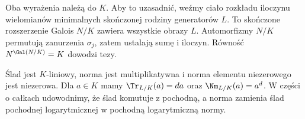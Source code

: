 Oba wyrażenia należą do $K$. Aby to uzasadnić, weźmy ciało rozkładu iloczynu wielomianów minimalnych skończonej rodziny generatorów $L$. To skończone rozszerzenie Galois $N/K$ zawiera wszystkie obrazy $L$. Automorfizmy $N/K$ permutują zanurzenia $\sigma_j$, zatem ustalają sumę i iloczyn. Równość $N^{\Gal(N/K)}=K$ dowodzi tezy.

Ślad jest $K$-liniowy, norma jest multiplikatywna i norma elementu niezerowego jest niezerowa. Dla $a\in K$ mamy $\Tr_{L/K}(a)=da$ oraz $\Nm_{L/K}(a)=a^d$. W części o całkach udowodnimy, że ślad komutuje z pochodną, a norma zamienia ślad pochodnej logarytmicznej w pochodną logarytmiczną normy.



